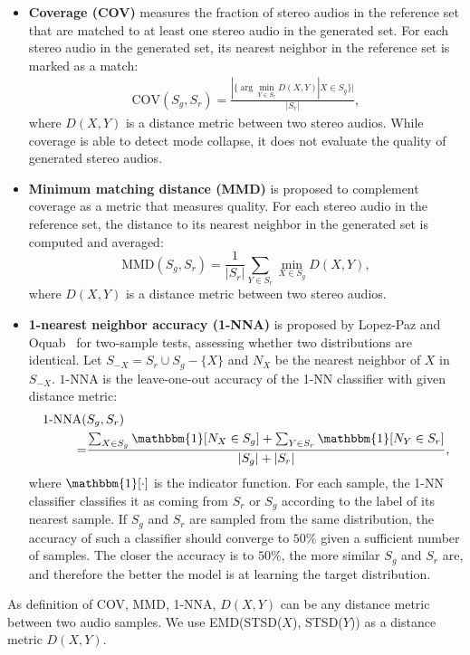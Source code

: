 \begin{itemize}
	\item\textbf{Coverage (COV)} measures the fraction of stereo audios in the reference set that are matched to at least one stereo audio in the generated set. For each stereo audio in the generated set, its nearest neighbor in the reference set is marked as a match:
	\begin{align*}
	\text{COV}(S_g, S_r) = \frac{|\{\arg\min_{Y \in S_r} D(X,Y) | X \in S_g \}|}{|S_r|},
	\end{align*}
	where $D(X,Y)$ is a distance metric between two stereo audios.
	While coverage is able to detect mode collapse, it does not evaluate the quality of generated stereo audios. 
	\item\textbf{Minimum matching distance (MMD)} is proposed to complement coverage as a metric that measures quality. For each stereo audio in the reference set, the distance to its nearest neighbor in the generated set is computed and averaged:
	\begin{equation}
	\text{MMD}(S_g, S_r) = \frac{1}{|S_r|}\sum_{Y\in S_r} \min_{X\in S_g} D(X,Y),\nonumber
	\end{equation}
	where $D(X,Y)$ is a distance metric between two stereo audios.
	\item \textbf{1-nearest neighbor accuracy (1-NNA)} is proposed by Lopez-Paz and Oquab~\cite{1-nna} for two-sample tests, assessing whether two distributions are identical.
	Let $S_{-X} = S_r \cup S_g - \{X\}$ and $N_X$ be the nearest neighbor of $X$ in $S_{-X}$. $1$-NNA is the leave-one-out accuracy of the 1-NN classifier with given distance metric:
	\begin{align*}
	\text{1-NNA}(&S_g, S_r) \\
	=&\frac{\sum_{X\in S_g} \mathbbm{1}[N_X \in S_g] +  \sum_{Y\in S_r} \mathbbm{1}[N_Y \in S_r]}{|S_g|+|S_r|} ,
	\end{align*}
	where $\mathbbm{1}[\cdot]$ is the indicator function.
	For each sample, the 1-NN classifier classifies it as coming from $S_r$ or $S_g$ according to the label of its nearest sample.
	If $S_g$ and $S_r$ are sampled from the same distribution, the accuracy of such a classifier should converge to $50\%$ given a sufficient number of samples. The closer the accuracy is to $50\%$, the more similar $S_g$ and $S_r$ are, and therefore the better the model is at learning the target distribution.
\end{itemize}
As definition of COV, MMD, 1-NNA, $D(X,Y)$ can be any distance metric between two audio samples. We use EMD(STSD($X$), STSD($Y$)) as a distance metric $D(X,Y)$.

